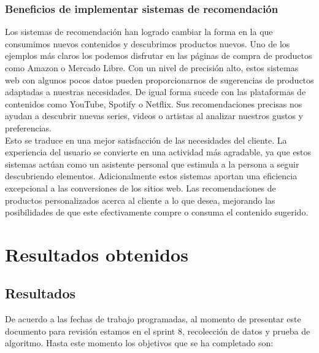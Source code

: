     \subsection{Beneficios de implementar sistemas de recomendación}
    Los sistemas de recomendación han logrado cambiar la forma en la que consumimos nuevos contenidos y descubrimos productos nuevos. Uno de los ejemplos más claros los podemos disfrutar en las páginas de compra de productos como Amazon o Mercado Libre. Con un nivel de precisión alto, estos sistemas web con algunos pocos datos pueden proporcionarnos de sugerencias de productos adaptadas a nuestras necesidades. De igual forma sucede con las plataformas de contenidos como YouTube, Spotify o Netflix. Sus recomendaciones precisas nos ayudan a descubrir nuevas series, videos o artistas al analizar nuestros gustos y preferencias.\\
    \newline
    Esto se traduce en una mejor satisfacción de las necesidades del cliente. La experiencia del usuario se convierte en una actividad más agradable, ya que estos sistemas actúan como un asistente personal que estimula a la persona a seguir descubriendo elementos. Adicionalmente estos sistemas aportan una eficiencia excepcional a las conversiones de los sitios web. Las recomendaciones de productos personalizados acerca al cliente a lo que desea, mejorando las posibilidades de que este efectivamente compre o consuma el contenido sugerido. \cite{mc6}
    


\chapter{Resultados obtenidos}

\section{Resultados}


De acuerdo a las fechas de trabajo programadas, al momento de presentar este documento para revisión estamos en el sprint 8, recolección de datos y prueba de algoritmo. Hasta este momento los objetivos que se ha completado son:

